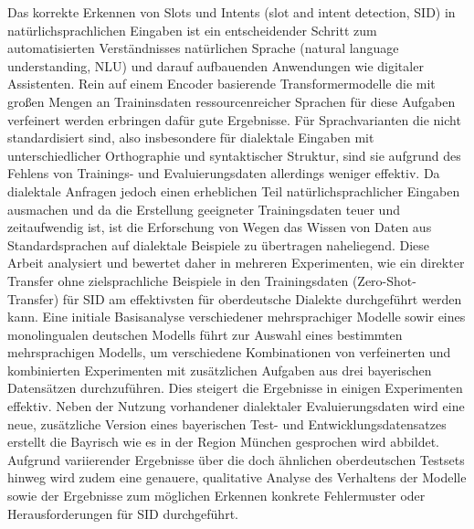 \documentclass[11pt,a4paper,twoside,openright]{scrbook}
\begin{document}
Das korrekte Erkennen von Slots und Intents (slot and intent detection, SID) in natürlichsprachlichen Eingaben ist ein entscheidender Schritt zum automatisierten Verständnisses natürlichen Sprache (natural language understanding, NLU) und darauf aufbauenden Anwendungen wie digitaler Assistenten. Rein auf einem Encoder basierende Transformermodelle die mit großen Mengen an Traininsdaten ressourcenreicher Sprachen für diese Aufgaben verfeinert werden erbringen dafür gute Ergebnisse. Für Sprachvarianten die nicht standardisiert sind, also insbesondere für dialektale Eingaben mit unterschiedlicher Orthographie und syntaktischer Struktur, sind sie aufgrund des Fehlens von Trainings- und Evaluierungsdaten allerdings weniger effektiv. Da dialektale Anfragen jedoch einen erheblichen Teil natürlichsprachlicher Eingaben ausmachen und da die Erstellung geeigneter Trainingsdaten teuer und zeitaufwendig ist, ist die Erforschung von Wegen das Wissen von Daten aus Standardsprachen auf dialektale Beispiele zu übertragen naheliegend. Diese Arbeit analysiert und bewertet daher in mehreren Experimenten, wie ein direkter Transfer ohne zielsprachliche Beispiele in den Trainingsdaten (Zero-Shot-Transfer) für SID am effektivsten für oberdeutsche Dialekte durchgeführt werden kann. Eine initiale Basisanalyse verschiedener mehrsprachiger Modelle sowir eines monolingualen deutschen Modells führt zur Auswahl eines bestimmten mehrsprachigen Modells, um verschiedene Kombinationen von verfeinerten und kombinierten Experimenten mit zusätzlichen Aufgaben aus drei bayerischen Datensätzen durchzuführen. Dies steigert die Ergebnisse in einigen Experimenten effektiv. Neben der Nutzung vorhandener dialektaler Evaluierungsdaten wird eine neue, zusätzliche Version eines bayerischen Test- und Entwicklungsdatensatzes erstellt die Bayrisch wie es in der Region München gesprochen wird abbildet. Aufgrund variierender Ergebnisse über die doch ähnlichen oberdeutschen Testsets hinweg wird zudem eine genauere, qualitative Analyse des Verhaltens der Modelle sowie der Ergebnisse zum möglichen Erkennen konkrete Fehlermuster oder Herausforderungen für SID durchgeführt.






\tableofcontents




\cleardoublepage
\end{document}
